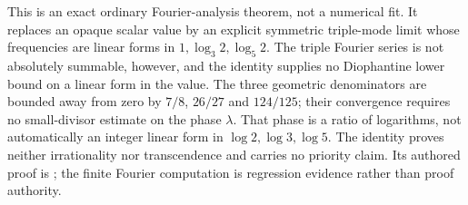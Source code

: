 This is an exact ordinary Fourier-analysis theorem, not a numerical fit.
It replaces an opaque scalar value by an explicit symmetric triple-mode
limit whose frequencies are linear forms in $1,\log_3 2,\log_5 2$.
The triple Fourier series is not absolutely summable, however, and the
identity supplies no Diophantine lower bound on a linear form in the value.
The three geometric denominators are bounded away from zero by $7/8$,
$26/27$ and $124/125$; their convergence requires no small-divisor estimate
on the phase $\lambda$.  That phase is a ratio of logarithms, not
automatically an integer linear form in $\log 2,\log 3,\log 5$.  The identity
proves neither irrationality nor transcendence and carries no priority claim.
Its authored proof is
; the finite
Fourier computation is regression evidence rather than proof authority.
